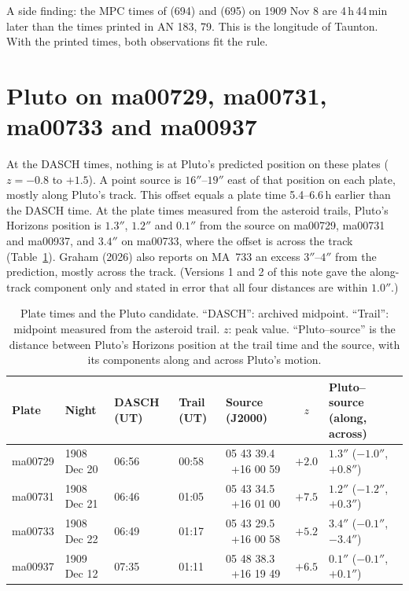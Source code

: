 \documentclass[11pt]{article}
\begin{document}
A side finding: the MPC times of (694) and (695) on 1909 Nov 8 are 4\,h\,44\,min later than the times printed in AN 183, 79. This is the longitude of Taunton. With the printed times, both observations fit the rule.

\section{Pluto on ma00729, ma00731, ma00733 and ma00937}
At the DASCH times, nothing is at Pluto's predicted position on these plates ($z=-0.8$ to $+1.5$). A point source is $16''$--$19''$ east of that position on each plate, mostly along Pluto's track. This offset equals a plate time 5.4--6.6\,h earlier than the DASCH time. At the plate times measured from the asteroid trails, Pluto's Horizons position is $1.3''$, $1.2''$ and $0.1''$ from the source on ma00729, ma00731 and ma00937, and $3.4''$ on ma00733, where the offset is across the track (Table~\ref{tab:times}). Graham (2026) also reports on MA~733 an excess $3''$--$4''$ from the prediction, mostly across the track. (Versions 1 and 2 of this note gave the along-track component only and stated in error that all four distances are within $1.0''$.)

\begin{table}[h]
\centering\footnotesize\setlength{\tabcolsep}{4pt}
\begin{tabular}{lllllcl}
\toprule
Plate & Night & DASCH (UT) & Trail (UT) & Source (J2000) & $z$ & Pluto--source (along, across)\\
\midrule
ma00729 & 1908 Dec 20 & 06:56 & 00:58 & 05 43 39.4 \ +16 00 59 & $+2.0$ & $1.3''$ ($-1.0''$, $+0.8''$)\\
ma00731 & 1908 Dec 21 & 06:46 & 01:05 & 05 43 34.5 \ +16 01 00 & $+7.5$ & $1.2''$ ($-1.2''$, $+0.3''$)\\
ma00733 & 1908 Dec 22 & 06:49 & 01:17 & 05 43 29.5 \ +16 00 58 & $+5.2$ & $3.4''$ ($-0.1''$, $-3.4''$)\\
ma00937 & 1909 Dec 12 & 07:35 & 01:11 & 05 48 38.3 \ +16 19 49 & $+6.5$ & $0.1''$ ($-0.1''$, $+0.1''$)\\
\bottomrule
\end{tabular}
\caption{Plate times and the Pluto candidate. ``DASCH'': archived midpoint. ``Trail'': midpoint measured from the asteroid trail. $z$: peak value. ``Pluto--source'' is the distance between Pluto's Horizons position at the trail time and the source, with its components along and across Pluto's motion.}\label{tab:times}
\end{table}
\end{document}
